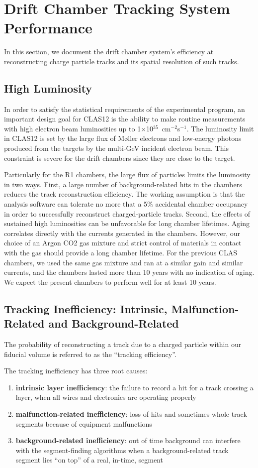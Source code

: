 \section{Drift Chamber Tracking System Performance}
In this section, we document the drift chamber system's
efficiency at reconstructing charge particle tracks and
its spatial resolution of such tracks.

\subsection{High Luminosity}
In order to satisfy the statistical requirements of the experimental program, 
an important design goal for CLAS12 is the ability to make routine measurements 
with high electron beam luminosities up to 
1$\times$10$^{35}$~cm$^{-2}$s$^{-1}$.  The luminosity limit in CLAS12 is 
set by the large flux of M{\o}ller electrons and low-energy photons 
produced from the targets by the multi-GeV incident electron beam.  This 
constraint is severe for the drift chambers since they are close to the 
target. 

Particularly for the R1 chambers, the large flux of 
particles limits the luminosity in two ways.  First, a large number of 
background-related hits in the chambers reduces the track reconstruction 
efficiency.  The working assumption is that the analysis software can tolerate 
no more that a 5$\%$ accidental chamber occupancy in order to successfully 
reconstruct charged-particle tracks.  Second, the effects of sustained high 
luminosities can be unfavorable for long chamber lifetimes.  Aging correlates 
directly with the currents generated in the chambers.
However, our choice of an Argon CO2 gas mixture and strict control of
materials in contact with the gas should provide a long chamber lifetime.
For the previous CLAS chambers, we used the same gas mixture and ran at a
similar gain and similar currents, and the chambers lasted more than 10 years 
with no indication
of aging.  We expect the present
chambers to perform well for at least 10 years.


\subsection{Tracking Inefficiency: Intrinsic, Malfunction-Related and Background-Related}
The probability of reconstructing a track due to a charged particle within
our fiducial volume is referred to as the ``tracking efficiency''.

The tracking inefficiency has three root causes:
\begin{enumerate}
\item {\bf intrinsic layer inefficiency}: the failure to record
a hit for a track crossing a layer, when all wires and electronics
are operating properly
\item {\bf malfunction-related inefficiency}: loss of hits and sometimes
whole track segments because of equipment malfunctions
\item {\bf background-related inefficiency}: out of time background
can interfere with the segment-finding algorithms when a background-related
track segment lies ``on top'' of a real, in-time, segment
\end{enumerate}

